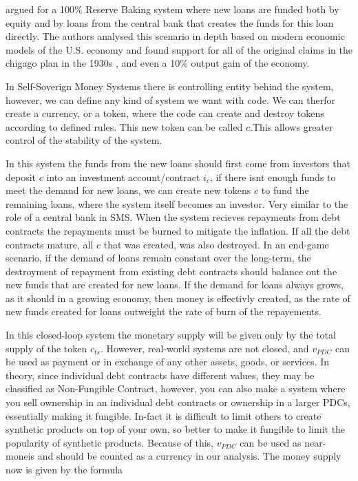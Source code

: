 \textcite{chicagorevisited} argued for a 100\% Reserve Baking system where new loans are funded both by equity and by loans from the central bank that creates the funds for this loan directly. The authors analysed this scenario in depth based on modern economic models of the U.S. economy and found support for all of the original claims in the chigago plan in the 1930s \cite{fisher1936}, and even a 10\% output gain of the economy. 

In Self-Soverign Money Systems there is controlling entity behind the system, however, we can define any kind of system we want with code. We can therfor create a currency, or a token, where the code can create and destroy tokens according to defined rules. This new token can be called $c$.This allows greater control of the stability of the system.

In this system the funds from the new loans should first come from investors that deposit $c$ into an investment account/contract $i_{c}$, if there isnt enough funds to meet the demand for new loans, we can create new tokens $c$ to fund the remaining loans, where the system itself becomes an investor. Very similar to the role of a central bank in SMS. When the system recieves repayments from debt contracts the repayments must be burned to mitigate the inflation. If all the debt contracts mature, all $c$ that was created, was also destroyed. In an end-game scenario, if the demand of loans remain constant over the long-term, the destroyment of repayment from existing debt contracts should balance out the new funds that are created for new loans. If the demand for loans always grows, as it should in a growing economy, then money is effectivly created, as the rate of new funds created for loans outweight the rate of burn of the repayements. 

In this closed-loop system the monetary supply will be given only by the total supply of the token $c_{ts}$. However, real-world systems are not closed, and $v_{PDC}$ can be used as payment or in exchange of any other assets, goods, or services. In theory, since individual debt contracts have different values, they may be classified as Non-Fungible Contract, however, you can also make a system where you sell ownership in an individual debt contracts or ownership in a larger PDCs, essentially making it fungible. In-fact it is difficult to limit others to create synthetic products on top of your own, so better to make it fungible to limit the popularity of synthetic products. Because of this, $v_{PDC}$ can be used as near-moneis and should be counted as a currency in our analysis. The money supply now is given by the formula

